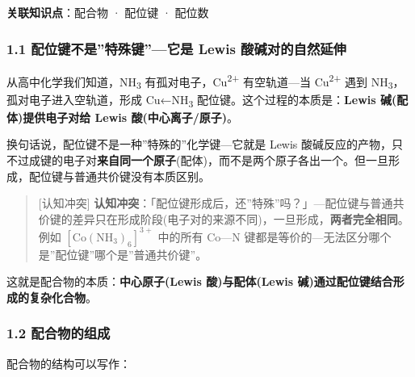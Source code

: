 \textbf{关联知识点}：配合物 · 配位键 · 配位数

\subsubsection{1.1 配位键不是''特殊键''---它是 Lewis 酸碱对的自然延伸}\label{ux914dux4f4dux952eux4e0dux662fux7279ux6b8aux952eux5b83ux662f-lewis-ux9178ux78b1ux5bf9ux7684ux81eaux7136ux5ef6ux4f38}

从高中化学我们知道，NH\textsubscript{3} 有孤对电子，Cu\textsuperscript{2+} 有空轨道---当 Cu\textsuperscript{2+} 遇到 NH\textsubscript{3}，孤对电子进入空轨道，形成 Cu←NH\textsubscript{3} 配位键。这个过程的本质是：\textbf{Lewis 碱(配体)提供电子对给 Lewis 酸(中心离子/原子)}。

换句话说，配位键不是一种''特殊的''化学键---它就是 Lewis 酸碱反应的产物，只不过成键的电子对\textbf{来自同一个原子}(配体)，而不是两个原子各出一个。但一旦形成，配位键与普通共价键没有本质区别。

\begin{quote}
{[}认知冲突{]} \textbf{认知冲突}：「配位键形成后，还''特殊''吗？」---配位键与普通共价键的差异只在形成阶段(电子对的来源不同)，一旦形成，\textbf{两者完全相同}。例如 \([\mathrm{Co(NH_3)_6}]^{3+}\) 中的所有 Co---N 键都是等价的---无法区分哪个是''配位键''哪个是''普通共价键''。
\end{quote}

这就是配合物的本质：\textbf{中心原子(Lewis 酸)与配体(Lewis 碱)通过配位键结合形成的复杂化合物}。

\subsubsection{1.2 配合物的组成}\label{ux914dux5408ux7269ux7684ux7ec4ux6210}

配合物的结构可以写作：

\begin{Shaded}
\begin{Highlighting}[]
\end{Highlighting}
\end{Shaded}

